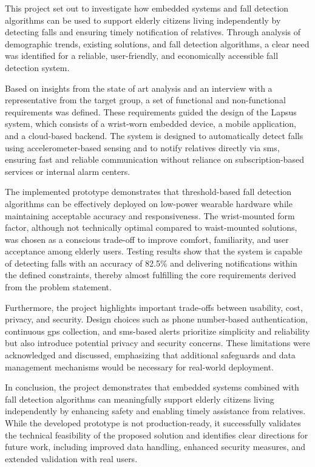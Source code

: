 This project set out to investigate how embedded systems and fall detection algorithms can be used to support elderly citizens living independently by detecting falls and ensuring timely notification of relatives. Through analysis of demographic trends, existing solutions, and fall detection algorithms, a clear need was identified for a reliable, user-friendly, and economically accessible fall detection system.

Based on insights from the state of art analysis and an interview with a representative from the target group, a set of functional and non-functional requirements was defined. These requirements guided the design of the Lapsus system, which consists of a wrist-worn embedded device, a mobile application, and a cloud-based backend. The system is designed to automatically detect falls using accelerometer-based sensing and to notify relatives directly via \gls{sms}, ensuring fast and reliable communication without reliance on subscription-based services or internal alarm centers.

The implemented prototype demonstrates that threshold-based fall detection algorithms can be effectively deployed on low-power wearable hardware while maintaining acceptable accuracy and responsiveness. The wrist-mounted form factor, although not technically optimal compared to waist-mounted solutions, was chosen as a conscious trade-off to improve comfort, familiarity, and user acceptance among elderly users. Testing results show that the system is capable of detecting falls with an accuracy of 82.5\% and delivering notifications within the defined constraints, thereby almost fulfilling the core requirements derived from the problem statement.

Furthermore, the project highlights important trade-offs between usability, cost, privacy, and security. Design choices such as phone number-based authentication, continuous \gls{gps} collection, and \gls{sms}-based alerts prioritize simplicity and reliability but also introduce potential privacy and security concerns. These limitations were acknowledged and discussed, emphasizing that additional safeguards and data management mechanisms would be necessary for real-world deployment.

In conclusion, the project demonstrates that embedded systems combined with fall detection algorithms can meaningfully support elderly citizens living independently by enhancing safety and enabling timely assistance from relatives. While the developed prototype is not production-ready, it successfully validates the technical feasibility of the proposed solution and identifies clear directions for future work, including improved data handling, enhanced security measures, and extended validation with real users.